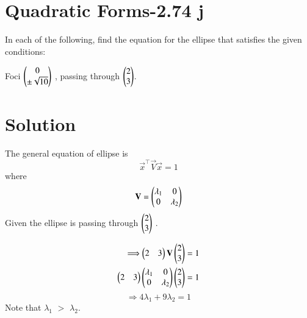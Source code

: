 \documentclass[journal,12pt,twocolumn]{IEEEtran}
\begin{document}
\section{Quadratic Forms-2.74 j}
In each of the following, find the equation for
the ellipse that satisfies the given conditions:

Foci $\begin{pmatrix}0 \\ \pm \sqrt{10}\end{pmatrix}$ , passing through $\begin{pmatrix}2\\3\end{pmatrix}$.

\section{Solution}
The general equation of ellipse is
\begin{equation}
    \vec{x}^{\top}\vec{V}\vec{x} = 1
\end{equation}
where
\begin{equation}
    \mathbf{V} = \begin{pmatrix}\lambda_1 & 0 \\ 0 & \lambda_2\end{pmatrix}
\end{equation} 
Given the ellipse is passing through $\begin{pmatrix}2\\3\end{pmatrix}$ .

\begin{align}
   \Longrightarrow  \begin{pmatrix}2&3\end{pmatrix}\mathbf{V} \begin{pmatrix}2\\3\end{pmatrix}& = 1\\
     \begin{pmatrix}2&3\end{pmatrix}\begin{pmatrix}\lambda_1&0\\0&\lambda_2\end{pmatrix} \begin{pmatrix}2\\3\end{pmatrix}& = 1
\end{align}
\begin{equation}
     \Longrightarrow 4\lambda_1 +9\lambda_2=1 \label{eq:5}
\end{equation}
Note that $\lambda_1$ $>$ $\lambda_2$.
\end{document}
